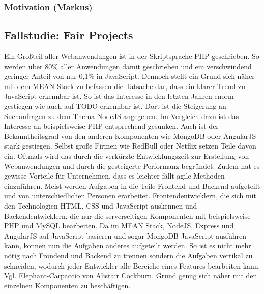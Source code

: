 \subsubsection{Motivation (Markus)}\label{motivation-markus}

\subsection{Fallstudie: Fair Projects}\label{fallstudie-fair-projects}

Ein Großteil aller Webanwendungen ist in der Skriptsprache PHP geschrieben. 
So werden über 80\% aller Anwendungen damit geschrieben und ein verschwindend geringer Anteil von nur 0,1\% in JavaScript.
Dennoch stellt ein Grund sich näher mit dem MEAN Stack zu befassen die Tatsache dar, dass ein klarer Trend zu JavaScript erkennbar ist.
So ist das Interesse in den letzten Jahren enorm gestiegen wie auch auf TODO erkennbar ist.
Dort ist die Steigerung an Suchanfragen zu dem Thema NodeJS angegeben.
Im Vergleich dazu ist das Interesse an beispielsweise PHP entsprechend gesunken. 
Auch ist der Bekanntheitsgrad von den anderen Komponenten wie MongoDB oder AngularJS stark gestiegen.
Selbst große Firmen wie RedBull oder Netflix setzen Teile davon ein.
Oftmals wird das durch die verkürzte Entwicklungszeit zur Erstellung von Webanwendungen und durch die gesteigerte Performanz begründet.
Zudem hat es gewisse Vorteile für Unternehmen, dass es leichter fällt agile Methoden einzuführen.
Meist werden Aufgaben in die Teile Frontend und Backend aufgeteilt und von unterschiedlichen Personen erarbeitet.
Frontendentwicklern, die sich mit den Technologien HTML, CSS und JavaScript auskennen und Backendentwicklern, die nur die serverseitigen Komponenten mit beispielsweise PHP und MySQL bearbeiten.
Da im MEAN Stack, NodeJS, Express und AngularJS auf JavaScript basieren und sogar MongoDB JavaScript ausführen kann, können nun die Aufgaben anderes aufgeteilt werden.
So ist es nicht mehr nötig nach Frondend und Backend zu trennen sondern die Aufgaben vertikal zu schneiden, wodurch jeder Entwickler alle Bereiche eines Features bearbeiten kann.
Vgl. Elephant-Carpaccio von Alistair Cockburn. 
Grund genug sich näher mit den einzelnen Komponenten zu beschäftigen.
